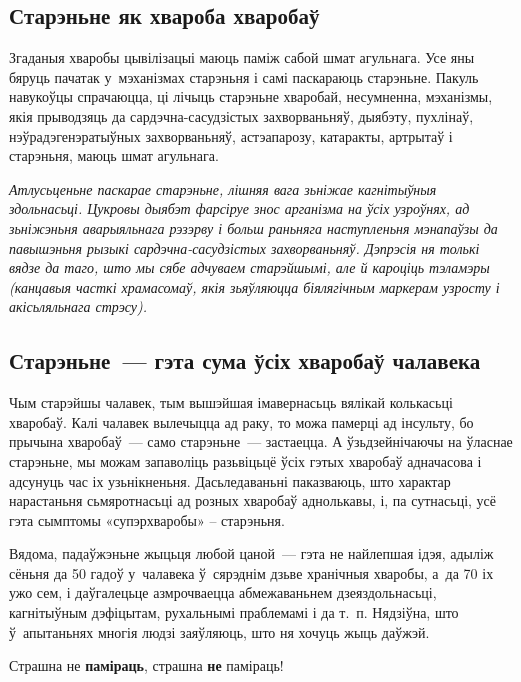 \subsection*{Старэньне як хвароба хваробаў}

Згаданыя хваробы цывілізацыі маюць паміж сабой шмат агульнага. Усе яны бяруць пачатак у~мэханізмах старэньня і самі паскараюць старэньне. Пакуль навукоўцы спрачаюцца, ці лічыць старэньне хваробай, несумненна, мэханізмы, якія прыводзяць да сардэчна-сасудзістых захворваньняў, дыябэту, пухлінаў, нэўрадэгенэратыўных захворваньняў, астэапарозу, катаракты, артрытаў і старэньня, маюць шмат агульнага.

\emph{Атлусьценьне паскарае старэньне, лішняя вага зьніжае кагнітыўныя здольнасьці. Цукровы дыябэт фарсіруе знос арганізма на ўсіх узроўнях, ад зьніжэньня аварыяльнага рэзэрву і больш раньняга наступленьня мэнапаўзы да павышэньня рызыкі сардэчна-сасудзістых захворваньняў. Дэпрэсія ня толькі вядзе да таго, што мы сябе адчуваем старэйшымі, але й кароціць тэламэры (канцавыя часткі храмасомаў, якія зьяўляюцца біялягічным маркерам узросту і акісьляльнага стрэсу).}

\subsection*{Старэньне~--- гэта сума ўсіх хваробаў чалавека}

Чым старэйшы чалавек, тым вышэйшая імавернасьць вялікай колькасьці хваробаў. Калі чалавек вылечыцца ад раку, то можа памерці ад інсульту, бо прычына хваробаў~--- само старэньне~--- застаецца. А ўзьдзейнічаючы на ўласнае старэньне, мы можам запаволіць разьвіцьцё ўсіх гэтых хваробаў адначасова і адсунуць час іх узьнікненьня. Дасьледаваньні паказваюць, што характар нарастаньня сьмяротнасьці ад розных хваробаў аднолькавы, і, па сутнасьці, усё гэта сымптомы «супэрхваробы» -- старэньня. 


Вядома, падаўжэньне жыцьця любой цаной~--- гэта не найлепшая ідэя, адыліж сёньня да 50 гадоў у~чалавека ў~сярэднім дзьве хранічныя хваробы, а~да 70 іх ужо сем, і даўгалецьце азмрочваецца абмежаваньнем дзеяздольнасьці, кагнітыўным дэфіцытам, рухальнымі праблемамі і да т.~п. Нядзіўна, што ў~апытаньнях многія людзі заяўляюць, што ня хочуць жыць даўжэй. 

Страшна не \textbf{паміраць}, страшна \textbf{не} паміраць!

